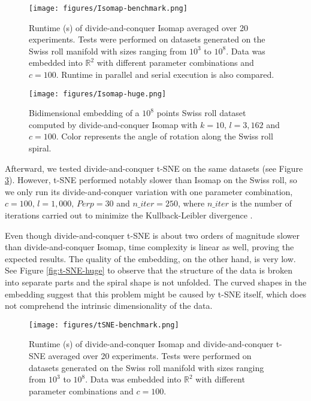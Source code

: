 \begin{figure}
    \centering
    \texttt{[image: figures/Isomap-benchmark.png]}
    \caption{Runtime (s) of divide-and-conquer Isomap averaged over 20 experiments. Tests were performed on datasets generated on the Swiss roll manifold with sizes ranging from $10^3$ to $10^8$. Data was embedded into $\mathbb{R}^2$ with different parameter combinations and $c=100$. Runtime in parallel and serial execution is also compared.}
    \label{fig:Isomap-benchmark}
\end{figure}

\begin{figure}
    \centering
    \texttt{[image: figures/Isomap-huge.png]}
    \caption{Bidimensional embedding of a $10^8$ points Swiss roll dataset computed by divide-and-conquer Isomap with $k=10, \, l=3,162$ and $c=100$. Color represents the angle of rotation along the Swiss roll spiral.}
    \label{fig:Isomap-huge}
\end{figure}

Afterward, we tested divide-and-conquer t-SNE on the same datasets (see Figure \ref{fig:t-SNE-benchmark}). However, t-SNE performed notably slower than Isomap on the Swiss roll, so we only run its divide-and-conquer variation with one parameter combination, $c = 100, \, l=1,000, \, Perp=30$ and $n\_iter=250$, where $n\_iter$ is the number of iterations carried out to minimize the Kullback-Leibler divergence \citep{Kullback1951}.

Even though divide-and-conquer t-SNE is about two orders of magnitude slower than divide-and-conquer Isomap, time complexity is linear as well, proving the expected results. The quality of the embedding, on the other hand, is very low. See Figure \ref{fig:t-SNE-huge} to observe that the structure of the data is broken into separate parts and the spiral shape is not unfolded. The curved shapes in the embedding suggest that this problem might be caused by t-SNE itself, which does not comprehend the intrinsic dimensionality of the data.

\begin{figure}
    \centering
    \texttt{[image: figures/tSNE-benchmark.png]}
    \caption{Runtime (s) of divide-and-conquer Isomap and divide-and-conquer t-SNE averaged over 20 experiments. Tests were performed on datasets generated on the Swiss roll manifold with sizes ranging from $10^3$ to $10^8$. Data was embedded into $\mathbb{R}^2$ with different parameter combinations and $c=100$.}
    \label{fig:t-SNE-benchmark}
\end{figure}

